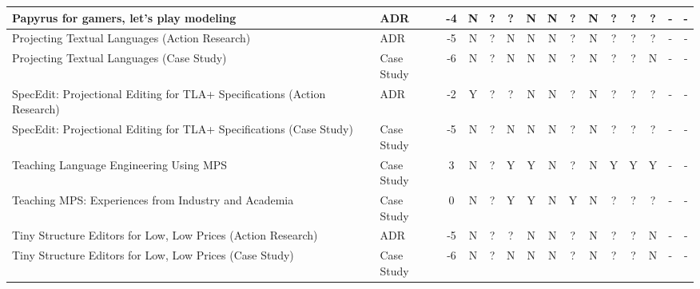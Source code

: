 \begin{landscape}
\begin{longtable}{ | p{11cm} | l | *{13}{c|} }
        Papyrus for gamers, let’s play modeling\cite{bucchiarone2020papyrus_SLR}                                                                                               & ADR               &  -4   & N & ? & ? & N & N & ? & N & ? & ? & ?  & - & - \\\hline
        Projecting Textual Languages (Action Research)\cite{merino2021projecting_SLR}                                                                                          & ADR               &  -5   & N & ? & N & N & N & ? & N & ? & ? & ?  & - & - \\\hline
        Projecting Textual Languages (Case Study)\cite{merino2021projecting_SLR}                                                                                               & Case Study        &  -6   & N & ? & N & N & N & ? & N & ? & ? & N  & - & - \\\hline
        SpecEdit: Projectional Editing for TLA+ Specifications (Action Research)\cite{cuinat2020specedit_SLR}                                                                  & ADR               &  -2   & Y & ? & ? & N & N & ? & N & ? & ? & ?  & - & - \\\hline
        SpecEdit: Projectional Editing for TLA+ Specifications (Case Study)\cite{cuinat2020specedit_SLR}                                                                       & Case Study        &  -5   & N & ? & N & N & N & ? & N & ? & ? & ?  & - & - \\\hline
        Teaching Language Engineering Using MPS\cite{prinz2021teaching_SLR}                                                                                                    & Case Study        &  3    & N & ? & Y & Y & N & ? & N & Y & Y & Y  & - & - \\\hline
        Teaching MPS: Experiences from Industry and Academia\cite{barash2021teaching_SLR}                                                                                      & Case Study        &  0    & N & ? & Y & Y & N & Y & N & ? & ? & ?  & - & - \\\hline
        Tiny Structure Editors for Low, Low Prices (Action Research)\cite{hempel2020tiny_SLR}                                                                                  & ADR               &  -5   & N & ? & ? & N & N & ? & N & ? & ? & N  & - & - \\\hline
        Tiny Structure Editors for Low, Low Prices (Case Study)\cite{hempel2020tiny_SLR}                                                                                       & Case Study        &  -6   & N & ? & N & N & N & ? & N & ? & ? & N  & - & - \\\hline

\end{longtable}
\end{landscape}
